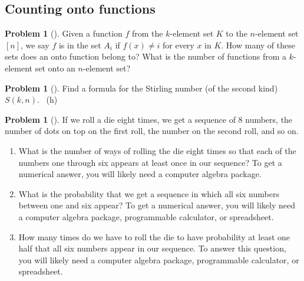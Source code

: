 \documentclass[10pt,]{book}
\theoremstyle{plain}
\theoremstyle{definition}
\newtheorem{activity}[project]{Problem}
\theoremstyle{definition}
\numberwithin{equation}{chapter}
\newcommand{\importantarrow}{\Rightarrow}
\begin{document}
\subsection[{Counting onto functions}]{Counting onto functions}\label{subsection-56}
\begin{activity}[] \label{numontofun}
\hypertarget{p-1384}{}%
Given a function \(f\) from the \(k\)-element set \(K\) to the \(n\)-element set \([n]\), we say \(f\) is in the set \(A_i\) if \(f(x)\not= i\) for every \(x\) in \(K\). How many of these  sets does an onto function belong to? What is the number of functions from a \(k\)-element set onto an \(n\)-element set?%
\end{activity}
\begin{activity}[]\marginsymbol[-1em]{\pdftooltip{$\importantarrow$}{especially interesting}} \label{activity-239}
\hypertarget{p-1386}{}%
Find a formula for the Stirling number (of the second kind) \(S(k,n)\).%
~{\tiny (h)}\end{activity}
\begin{activity}[]\marginsymbol[-1em]{} \label{activity-240}
\hypertarget{p-1389}{}%
If we roll a die eight times, we get a sequence of 8 numbers, the number of dots on top on the first roll, the number on the second roll, and so on.%
\begin{enumerate}[font=\bfseries,label=(\alph*),ref=\alph*]
\item\label{task-178} \marginsymbol[-2.5em]{} \hypertarget{p-1390}{}%
What is the number of ways of rolling the die eight times so that each of the numbers one through six appears at least once in our sequence? To get a numerical answer, you will likely need a computer algebra package.%
\item\label{task-179} \marginsymbol[-2.5em]{} \hypertarget{p-1392}{}%
What is the probability that we get a sequence in which all six numbers between one and six appear? To get a numerical answer, you will likely need a computer algebra package, programmable calculator, or spreadsheet.%
\item\label{task-180} \marginsymbol[-2.5em]{} \hypertarget{p-1394}{}%
How many times do we have to roll the die to have probability at least one half that all six numbers appear in our sequence. To answer this question, you will likely need a computer algebra package, programmable calculator, or spreadsheet.%
\end{enumerate}
\end{activity}
\typeout{************************************************}
\typeout{************************************************}
\end{document}
